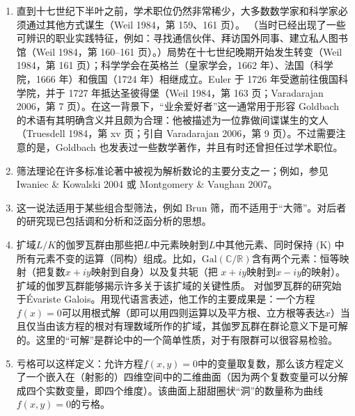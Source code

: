 \begin{enumerate}
这是《孙子算经》中本来简明实用的论述中出现的最后一个问题。
\item 直到十七世纪下半叶之前，学术职位仍然非常稀少，大多数数学家和科学家必须通过其他方式谋生（Weil 1984，第 159、161 页）。 （当时已经出现了一些可辨识的职业实践特征，例如：寻找通信伙伴、拜访国外同事、建立私人图书馆（Weil 1984，第 160–161 页）。）局势在十七世纪晚期开始发生转变（Weil 1984，第 161 页）；科学学会在英格兰（皇家学会，1662 年）、法国（科学院，1666 年）和俄国（1724 年）相继成立。Euler 于 1726 年受邀前往俄国科学院，并于 1727 年抵达圣彼得堡（Weil 1984，第 163 页；Varadarajan 2006，第 7 页）。在这一背景下，“业余爱好者”这一通常用于形容 Goldbach 的术语有其明确含义并且颇为合理：他被描述为一位靠做间谍谋生的文人（Truesdell 1984，第 xv 页；引自 Varadarajan 2006，第 9 页）。不过需要注意的是，Goldbach 也发表过一些数学著作，并且有时还曾担任过学术职位。
\item 筛法理论在许多标准论著中被视为解析数论的主要分支之一；例如，参见 Iwaniec & Kowalski 2004 或 Montgomery & Vaughan 2007。
\item 这一说法适用于某些组合型筛法，例如 Brun 筛，而不适用于“大筛”。对后者的研究现已包括调和分析和泛函分析的思想。
\item 扩域$L/K$的伽罗瓦群由那些把$L$中元素映射到$L$中其他元素、同时保持 (K) 中所有元素不变的运算（同构）组成。比如，$\mathrm{Gal}(\mathbb{C}/\mathbb{R})$含有两个元素：恒等映射（把复数$x+iy$映射到自身）以及复共轭（把 $x+iy$映射到$x-iy$的映射）。扩域的伽罗瓦群能够揭示许多关于该扩域的关键性质。
对伽罗瓦群的研究始于Évariste Galois。用现代语言表述，他工作的主要成果是：一个方程$f(x) = 0$可以用根式解（即可以用四则运算以及平方根、立方根等表达$x$）当且仅当由该方程的根对有理数域所作的扩域，其伽罗瓦群在群论意义下是可解的。这里的“可解”是群论中的一个简单性质，对于有限群可以很容易检验。
\item 亏格可以这样定义：允许方程$f(x,y) = 0$中的变量取复数，那么该方程定义了一个嵌入在（射影的）四维空间中的二维曲面（因为两个复数变量可以分解成四个实数变量，即四个维度）。该曲面上甜甜圈状“洞”的数量称为曲线$f(x,y) = 0$的亏格。
\end{enumerate}
